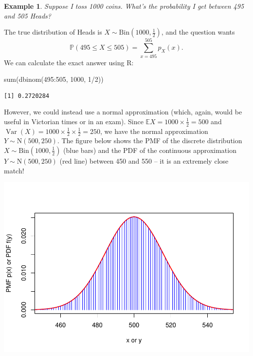 \documentclass[
  a4paper,
]{book}
\newenvironment{Shaded}{\begin{snugshade}}{\end{snugshade}}
\newcommand{\DecValTok}[1]{\textcolor[rgb]{0.00,0.00,0.81}{#1}}
\newcommand{\FunctionTok}[1]{\textcolor[rgb]{0.00,0.00,0.00}{#1}}
\newcommand{\NormalTok}[1]{#1}
\newcommand{\SpecialCharTok}[1]{\textcolor[rgb]{0.00,0.00,0.00}{#1}}
\theoremstyle{definition}
\theoremstyle{definition}
\newtheorem{example}{Example}[chapter]
\theoremstyle{definition}
\theoremstyle{definition}
\theoremstyle{remark}
\begin{document}
\begin{example}
\emph{Suppose I toss 1000 coins. What's the probability I get between 495 and 505 Heads?}

The true distribution of Heads is \(X \sim \mathrm{Bin}(1000, \frac12)\), and the question wants
\[ \mathbb P(495 \leq X \leq 505) = \sum_{x = 495}^{505} p_X(x) . \]
We can calculate the exact answer using R:

\begin{Shaded}
\begin{Highlighting}[]
\FunctionTok{sum}\NormalTok{(}\FunctionTok{dbinom}\NormalTok{(}\DecValTok{495}\SpecialCharTok{:}\DecValTok{505}\NormalTok{, }\DecValTok{1000}\NormalTok{, }\DecValTok{1}\SpecialCharTok{/}\DecValTok{2}\NormalTok{))}
\end{Highlighting}
\end{Shaded}

\begin{verbatim}
[1] 0.2720284
\end{verbatim}

However, we could instead use a normal approximation (which, again, would be useful in Victorian times or in an exam). Since \(\mathbb EX = 1000 \times \frac12 = 500\) and \(\operatorname{Var}(X) = 1000 \times \frac12 \times \frac12 = 250\), we have the normal approximation \(Y \sim \mathrm N(500, 250)\). The figure below shows the PMF of the discrete distribution \(X \sim \mathrm{Bin}(1000, \frac12)\) (blue bars) and the PDF of the continuous approximation \(Y\sim \mathrm N(500, 250)\) (red line) between 450 and 550 -- it is an extremely close match!

\includegraphics{math1710_files/figure-latex/norm-bin-1.pdf}


\end{example}
\end{document}
